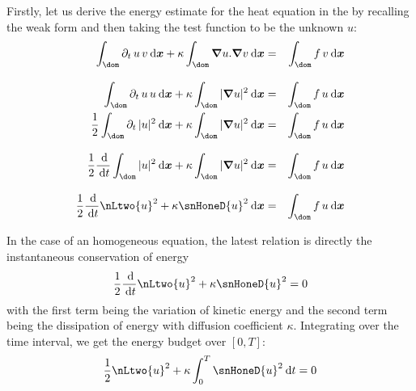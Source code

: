 Firstly, let us derive the energy estimate for the heat equation in the by recalling the weak form and then taking the test function to be the unknown $u$:
\begin{eqnarray*}
\int_\dom \pdt u\, v \dxx + \kappa \int_\dom \Grad u . \Grad v \dxx &=& \int_\dom f\,v \dxx \\[2ex]
\int_\dom \pdt u\, u \dxx + \kappa \int_\dom | \Grad u |^2 \dxx &=& \int_\dom f\,u \dxx \\
\dfrac{1}{2}\int_\dom \pdt |u|^2 \dxx + \kappa \int_\dom | \Grad u |^2 \dxx &=& \int_\dom f\,u \dxx \\[2ex]
\dfrac{1}{2} \ddd{t} \int_\dom  |u|^2 \dxx + \kappa \int_\dom | \Grad u |^2 \dxx &=& \int_\dom f\,u \dxx \\[2ex]
\dfrac{1}{2} \ddd{t} \nLtwo{u}^2 + \kappa \snHoneD{u}^2 \dxx &=& \int_\dom f\,u \dxx
\end{eqnarray*}

In the case of an homogeneous equation, the latest relation is directly the instantaneous conservation of energy
\begin{equation}
\dfrac{1}{2} \ddd{t} \nLtwo{u}^2 + \kappa \snHoneD{u}^2 = 0
\end{equation}
with the first term being the variation of kinetic energy and the second term being the dissipation of energy with diffusion coefficient $\kappa$.
Integrating over the time interval, we get the energy budget over $[0,T]$:
\begin{equation}\label{eq:energy_budget}
\dfrac{1}{2} \nLtwo{u}^2 + \kappa \int_{0}^T \snHoneD{u}^2 \dt = 0
\end{equation}

